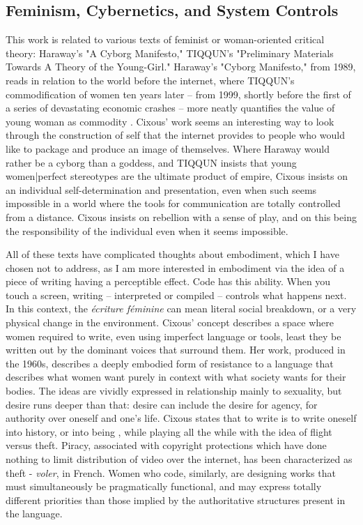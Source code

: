 \subsection{Feminism, Cybernetics, and System Controls}
This work is related to various texts of feminist or woman-oriented critical theory: Haraway's "A Cyborg Manifesto," TIQQUN's "Preliminary Materials Towards A Theory of the Young-Girl." Haraway's "Cyborg Manifesto," from 1989, reads in relation to the world before the internet, where TIQQUN's commodification of women ten years later – from 1999, shortly before the first of a series of devastating economic crashes – more neatly quantifies the value of young woman as commodity \parencite{cixous}\parencite{tiqqun}. Cixous' work seems an interesting way to look through the construction of self that the internet provides to people who would like to package and produce an image of themselves. Where Haraway would rather be a cyborg than a goddess, and TIQQUN insists that young women|perfect stereotypes are the ultimate product of empire, Cixous insists on an individual self-determination and presentation, even when such seems impossible in a world where the tools for communication are totally controlled from a distance. Cixous insists on rebellion with a sense of play, and on this being the responsibility of the individual even when it seems impossible. 

All of these texts have complicated thoughts about embodiment, which I have chosen not to address, as I am more interested in embodiment via the idea of a piece of writing having a perceptible effect. Code has this ability. When you touch a screen, writing – interpreted or compiled – controls what happens next. In this context, the \textit{écriture féminine} can mean literal social breakdown, or a very physical change in the environment. Cixous' concept describes a space where women required to write, even using imperfect language or tools, least they be written out by the dominant voices that surround them. Her work, produced in the 1960s, describes a deeply embodied form of resistance to a language that describes what women want purely in context with what society wants for their bodies. The ideas are vividly expressed in relationship mainly to sexuality, but desire runs deeper than that: desire can include the desire for agency, for authority over oneself and one's life. Cixous states that to write is to write oneself into history, or into being \parencite{cixous}, while playing all the while with the idea of flight versus theft. Piracy, associated with copyright protections which have done nothing to limit distribution of video over the internet, has been characterized as theft - \textit{voler}, in French. Women who code, similarly, are designing works that must simultaneously be pragmatically functional, and may express totally different priorities than those implied by the authoritative structures present in the language.

